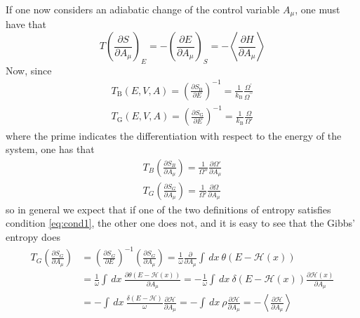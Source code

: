 If one now considers an adiabatic change of the control variable $A_\mu$, one must have that
\begin{equation}
    T\left(\frac{\partial S}{\partial A_{\mu}}\right)_{E}=-\left(\frac{\partial E}{\partial A_{\mu}}\right)_{S}=-\left\langle\frac{\partial H}{\partial A_{\mu}}\right\rangle
    \label{eq:cond1}
\end{equation}
Now, since
\begin{equation}
    \begin{array}{l}
        T_{\mathrm{B}}(E, V, A)=\left(\frac{\partial S_{\mathrm{B}}}{\partial E}\right)^{-1} = \frac{1}{k_{\mathrm{B}}} \frac{\Omega^{\prime}}{\Omega^{\prime \prime}} \\
        T_{\mathrm{G}}(E, V, A)=\left(\frac{\partial S_{\mathrm{G}}}{\partial E}\right)^{-1}=\frac{1}{k_{\mathrm{B}}} \frac{\Omega}{\Omega'}
        \end{array}
    \label{eq:temperatures_definition}
\end{equation}
where the prime indicates the differentiation with respect to the energy of the system, one has that 
\begin{gather*}
    T_B \left(\frac{\partial S_B}{\partial A_{\mu}}\right) = \frac{1}{\Omega''} \frac{\partial \Omega'}{\partial A_{\mu}} \\
    T_G \left(\frac{\partial S_G}{\partial A_{\mu}}\right) = \frac{1}{\Omega'} \frac{\partial \Omega}{\partial A_{\mu}}
\end{gather*}
so in general we expect that if one of the two definitions of entropy satisfies condition \ref{eq:cond1}, the other one does not, and it is easy to see that the Gibbs' entropy does
\begin{equation*}\begin{aligned}
    T_{G}\left(\frac{\partial S_{G}}{\partial A_{\mu}}\right) &=\left(\frac{\partial S_{G}}{\partial E}\right)^{-1}\left(\frac{\partial S_{G}}{\partial A_{\mu}}\right)=\frac{1}{\omega} \frac{\partial}{\partial A_{\mu}} \int \, dx \ \theta(E-\mathcal{H}(x)) \\
    &=\frac{1}{\omega} \int \, dx \ \frac{\partial \theta(E-\mathcal{H}(x))}{\partial A_{\mu}} = -\frac{1}{\omega} \int \, dx \ \delta(E-\mathcal{H}(x)) \frac{\partial \mathcal{H}(x)}{\partial A_{\mu}} \\
    &=-\int \, dx \ \frac{\delta(E-\mathcal{H})}{\omega} \frac{\partial \mathcal{H}}{\partial A_{\mu}} = -\int \, dx \ \rho \frac{\partial \mathcal{H}}{\partial A_{\mu}} = -\left\langle\frac{\partial \mathcal{H}}{\partial A_{\mu}}\right\rangle
\end{aligned}\end{equation*}
